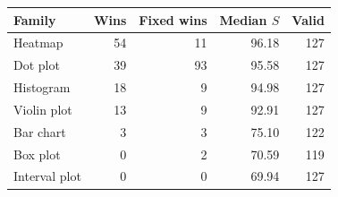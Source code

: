 \begin{tabular}{lrrrr}\toprule
Family & Wins & Fixed wins & Median $S$ & Valid\\\midrule
Heatmap & 54 & 11 & 96.18 & 127\\
Dot plot & 39 & 93 & 95.58 & 127\\
Histogram & 18 & 9 & 94.98 & 127\\
Violin plot & 13 & 9 & 92.91 & 127\\
Bar chart & 3 & 3 & 75.10 & 122\\
Box plot & 0 & 2 & 70.59 & 119\\
Interval plot & 0 & 0 & 69.94 & 127\\
\bottomrule\end{tabular}